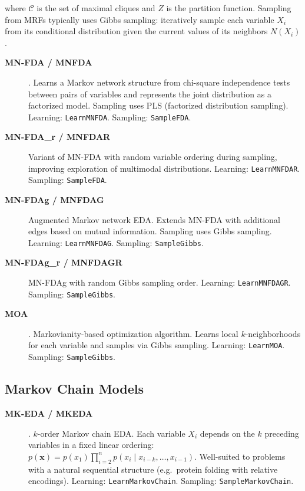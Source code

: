 \documentclass[a4paper,11pt]{article}
\begin{document}
where $\mathcal{C}$ is the set of maximal cliques and $Z$ is the partition
function.  Sampling from MRFs typically uses Gibbs sampling: iteratively
sample each variable $X_i$ from its conditional distribution given the
current values of its neighbors $N(X_i)$.

\begin{description}
  \item[\textbf{MN-FDA / MNFDA}] \citep{Santana:2005}.
    Learns a Markov network structure from chi-square independence tests
    between pairs of variables and represents the joint distribution as
    a factorized model.  Sampling uses PLS (factorized distribution sampling).
    Learning: \texttt{LearnMNFDA}. Sampling: \texttt{SampleFDA}.

  \item[\textbf{MN-FDA\_r / MNFDAR}]
    Variant of MN-FDA with random variable ordering during sampling, improving
    exploration of multimodal distributions.
    Learning: \texttt{LearnMNFDAR}. Sampling: \texttt{SampleFDA}.

  \item[\textbf{MN-FDAg / MNFDAG}]
    Augmented Markov network EDA.  Extends MN-FDA with additional edges
    based on mutual information.  Sampling uses Gibbs sampling.
    Learning: \texttt{LearnMNFDAG}. Sampling: \texttt{SampleGibbs}.

  \item[\textbf{MN-FDAg\_r / MNFDAGR}]
    MN-FDAg with random Gibbs sampling order.
    Learning: \texttt{LearnMNFDAGR}. Sampling: \texttt{SampleGibbs}.

  \item[\textbf{MOA}] \citep{Shakya_and_McCall:2007,Shakya_and_Santana:2008}.
    Markovianity-based optimization algorithm.  Learns local $k$-neighborhoods
    for each variable and samples via Gibbs sampling.
    Learning: \texttt{LearnMOA}. Sampling: \texttt{SampleGibbs}.
\end{description}

\subsection{Markov Chain Models}
\label{sec:markov_chain}

\begin{description}
  \item[\textbf{MK-EDA / MKEDA}] \citep{Santana_et_al:2004}.
    $k$-order Markov chain EDA.  Each variable $X_i$ depends on the $k$
    preceding variables in a fixed linear ordering:
    $p(\mathbf{x}) = p(x_1)\prod_{i=2}^{n} p(x_i \mid x_{i-k}, \ldots, x_{i-1})$.
    Well-suited to problems with a natural sequential structure (e.g.\
    protein folding with relative encodings).
    Learning: \texttt{LearnMarkovChain}. Sampling: \texttt{SampleMarkovChain}.
\end{description}
\end{document}
